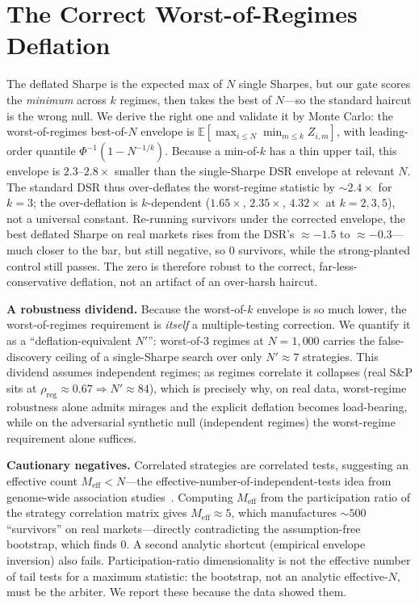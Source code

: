 \documentclass[sigconf,review,anonymous]{acmart}
\begin{document}
\section{The Correct Worst-of-Regimes Deflation}
\label{sec:deflation}
The deflated Sharpe is the expected max of $N$ single Sharpes, but our gate scores the \emph{minimum} across $k$ regimes, then takes the best of $N$---so the standard haircut is the wrong null. We derive the right one and validate it by Monte Carlo: the worst-of-regimes best-of-$N$ envelope is $\mathbb{E}\!\left[\max_{i\le N}\min_{m\le k} Z_{i,m}\right]$, with leading-order quantile $\Phi^{-1}(1-N^{-1/k})$. Because a min-of-$k$ has a thin upper tail, this envelope is $2.3$--$2.8\times$ smaller than the single-Sharpe DSR envelope at relevant $N$. The standard DSR thus over-deflates the worst-regime statistic by ${\sim}2.4\times$ for $k{=}3$; the over-deflation is $k$-dependent ($1.65\times$, $2.35\times$, $4.32\times$ at $k{=}2,3,5$), not a universal constant. Re-running survivors under the corrected envelope, the best deflated Sharpe on real markets rises from the DSR's ${\approx}{-}1.5$ to ${\approx}{-}0.3$---much closer to the bar, but still negative, so $0$ survivors, while the strong-planted control still passes. The zero is therefore robust to the correct, far-less-conservative deflation, not an artifact of an over-harsh haircut.

\textbf{A robustness dividend.} Because the worst-of-$k$ envelope is so much lower, the worst-of-regimes requirement is \emph{itself} a multiple-testing correction. We quantify it as a ``deflation-equivalent $N'$'': worst-of-3 regimes at $N{=}1{,}000$ carries the false-discovery ceiling of a single-Sharpe search over only $N'{\approx}7$ strategies. This dividend assumes independent regimes; as regimes correlate it collapses (real S\&P sits at $\rho_{\text{reg}}{\approx}0.67 \Rightarrow N'{\approx}84$), which is precisely why, on real data, worst-regime robustness alone admits mirages and the explicit deflation becomes load-bearing, while on the adversarial synthetic null (independent regimes) the worst-regime requirement alone suffices.

\textbf{Cautionary negatives.} Correlated strategies are correlated tests, suggesting an effective count $M_{\text{eff}}<N$---the effective-number-of-independent-tests idea from genome-wide association studies~\cite{nyholt2004,galwey2009}. Computing $M_{\text{eff}}$ from the participation ratio of the strategy correlation matrix gives $M_{\text{eff}}{\approx}5$, which manufactures ${\sim}500$ ``survivors'' on real markets---directly contradicting the assumption-free bootstrap, which finds $0$. A second analytic shortcut (empirical envelope inversion) also fails. Participation-ratio dimensionality is not the effective number of tail tests for a maximum statistic: the bootstrap, not an analytic effective-$N$, must be the arbiter. We report these because the data showed them.
\end{document}
